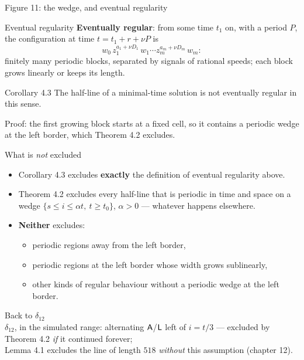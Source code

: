 \begin{frame}{Figure 11: the wedge, and eventual regularity}
\centering\fig[0.78]{}
\end{frame}

\begin{frame}{Eventual regularity}
\textbf{Eventually regular}: from some time $t_1$ on, with a period $P$, the configuration at time $t=t_1+r+\nu P$ is
\[w_0\,z_1^{a_1+\nu D_1}\,w_1\cdots z_m^{a_m+\nu D_m}\,w_m :\]
finitely many periodic blocks, separated by signals of rational speeds; each block grows linearly or keeps its length.\\[1ex]
\begin{statement}{Corollary 4.3}
The half-line of a minimal-time solution is not eventually regular in this sense.
\end{statement}
\small Proof: the first growing block starts at a fixed cell, so it contains a periodic wedge at the left border, which Theorem 4.2 excludes.
\end{frame}

\begin{frame}{What is \emph{not} excluded}
\begin{itemize}
\item Corollary 4.3 excludes \textbf{exactly} the definition of eventual regularity above.
\item Theorem 4.2 excludes every half-line that is periodic in time and space on a wedge $\{s\le i\le\alpha t,\ t\ge t_0\}$, $\alpha>0$ --- whatever happens elsewhere.
\item \textbf{Neither} excludes:
\begin{itemize}
\item periodic regions away from the left border,
\item periodic regions at the left border whose width grows sublinearly,
\item other kinds of regular behaviour without a periodic wedge at the left border.
\end{itemize}
\end{itemize}
\end{frame}

\begin{frame}{Back to $\delta_{12}$}
\centering\fig[0.62]{}\\[1ex]
\small $\delta_{12}$, in the simulated range: alternating $\mathsf A$/$\mathsf L$ left of $i=t/3$ --- excluded by Theorem 4.2 \emph{if} it continued forever;\\ Lemma 4.1 excludes the line of length $518$ \emph{without} this assumption (chapter 12).
\end{frame}

